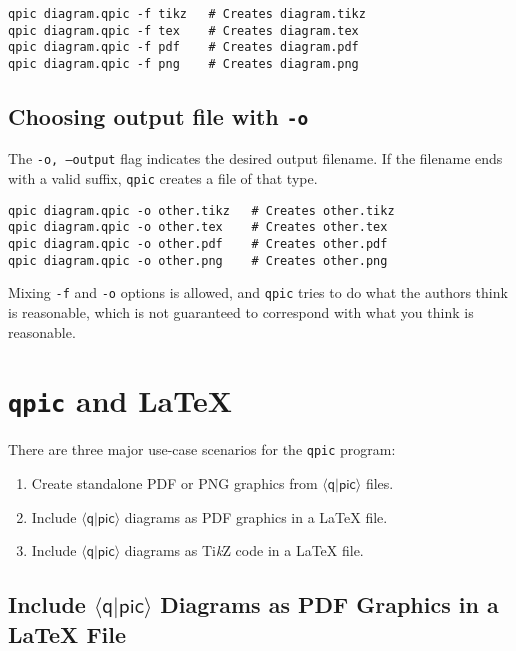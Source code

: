 \documentclass[twoside,12pt]{article}
\newcommand{\qpic}{$\langle\mathsf{q}|\mathsf{pic}\rangle$\xspace}
\newcommand{\qpicpy}{{\tt qpic}\xspace}
\newcommand{\TikZ}{Ti\emph{k}Z\xspace}
\begin{document}
\begin{minipage}{5in}
\begin{lstlisting}[basicstyle=\normalsize\ttfamily,numbers=none]
qpic diagram.qpic -f tikz   # Creates diagram.tikz
qpic diagram.qpic -f tex    # Creates diagram.tex
qpic diagram.qpic -f pdf    # Creates diagram.pdf
qpic diagram.qpic -f png    # Creates diagram.png
\end{lstlisting}
\end{minipage}

\subsection{Choosing output file with {\tt -o}}
The {\tt -o, --output} flag indicates the desired output filename. If the
filename ends with a valid suffix, \qpicpy creates a file
of that type.

\begin{minipage}{5in}
\begin{lstlisting}[basicstyle=\normalsize\ttfamily,numbers=none]
qpic diagram.qpic -o other.tikz   # Creates other.tikz
qpic diagram.qpic -o other.tex    # Creates other.tex
qpic diagram.qpic -o other.pdf    # Creates other.pdf
qpic diagram.qpic -o other.png    # Creates other.png
\end{lstlisting}
\end{minipage}

Mixing {\tt -f} and {\tt -o} options is allowed, and \qpicpy tries to do what
the authors think is reasonable, which is not guaranteed to
correspond with what you think is reasonable.

\section{\qpicpy and \LaTeX}
\label{sec-tools}

There are three major use-case scenarios for the \qpicpy program:
\begin{enumerate}
\item Create standalone PDF or PNG graphics from \qpic files.
\item Include \qpic diagrams as PDF graphics in a {\LaTeX} file.
\item Include \qpic diagrams as \TikZ code in a {\LaTeX} file.
\end{enumerate}


\subsection{Include \qpic Diagrams as PDF Graphics in a {\LaTeX} File}
\end{document}
